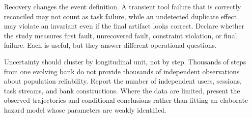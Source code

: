 Recovery changes the event definition. A transient tool failure that is correctly reconciled may not count as task failure, while an undetected duplicate effect may violate an invariant even if the final artifact looks correct. Declare whether the study measures first fault, unrecovered fault, constraint violation, or final failure. Each is useful, but they answer different operational questions.

Uncertainty should cluster by longitudinal unit, not by step. Thousands of steps from one evolving bank do not provide thousands of independent observations about population reliability. Report the number of independent users, sessions, task streams, and bank constructions. Where the data are limited, present the observed trajectories and conditional conclusions rather than fitting an elaborate hazard model whose parameters are weakly identified.

